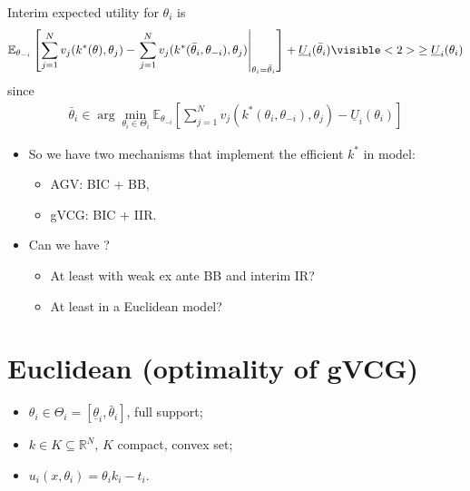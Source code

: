 \documentclass[english,handout]{beamer}		%
\def\lyxframeend{} %
\begin{document}
Interim expected utility for $\theta_i$ is
{\small
	\begin{align*}
		\mathbb{E}_{\theta_{-i}} \left[ \sum_{j =1}^N v_j (k^*(\theta),\theta_j) - \left. \sum_{j =1}^N v_j (k^*(\bar{\theta}_i,\theta_{-i}),\theta_j) \right|_{\theta_i = \bar{\theta}_i} \right] + \underline{U}_i (\bar{\theta}_i)
		\visible<2>{
			\geq \underline{U}_i(\theta_i)
		}
	\end{align*}
}
\pause
since
\begin{align*}
	\bar{\theta}_i \in \arg \min_{\theta_i \in \Theta_i} \mathbb{E}_{\theta_{-i}} \left[ \sum_{j=1}^{N} v_j (k^*(\theta_i,\theta_{-i}),\theta_j) - \underline{U}_i (\theta_i) \right]
\end{align*}
\lyxframeend


\begin{itemize}
	\item So we have two mechanisms that implement the efficient $k^*$ in  model:
	\begin{itemize}
		\item AGV: BIC + BB,
		\item gVCG: BIC + IIR.
	\end{itemize}
	\pause
	\item Can we have ? 
	\begin{itemize}
		\item At least with weak ex ante BB and interim IR?
		\item At least in a \alert{Euclidean} model?
	\end{itemize}
\end{itemize}
\lyxframeend


\section{Euclidean (optimality of gVCG)}

\begin{itemize}
	\item $\theta_i \in \Theta_{i} = [\underline{\theta}_i, \bar{\theta}_i]$, full support;
	\item $k \in K \subseteq \mathbb{R}^N$, $K$ compact, convex set;
	\item $u_i(x,\theta_i) = \theta_i k_i - t_i$.
\end{itemize}
\lyxframeend
\end{document}
